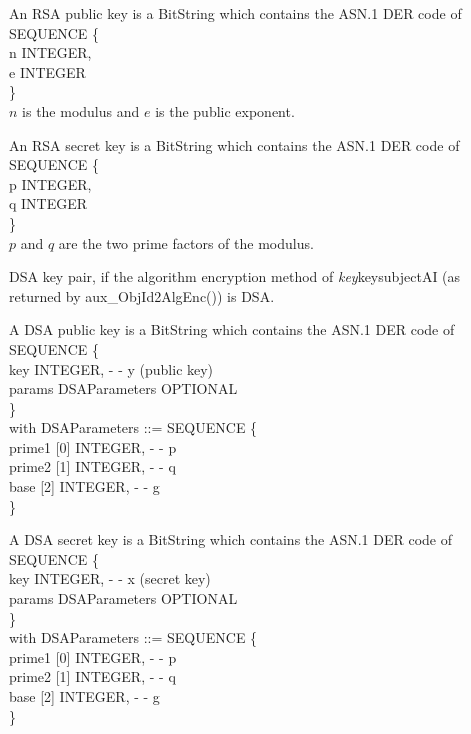     An RSA public key is a BitString
    which contains the ASN.1 DER code of
    \bvtab
    \4  SEQUENCE \{ \\
    \4  \2       n INTEGER,   \\
    \4  \2       e INTEGER  \\
    \4  \} \\
    \evtab
    $n$ is the modulus and $e$ is the public exponent.
    

    An RSA secret key is a BitString
    which contains the ASN.1 DER code of
    \bvtab
    \4  SEQUENCE \{ \\
    \4  \2       p INTEGER,   \\
    \4  \2       q INTEGER  \\
    \4  \} \\
    \evtab
    $p$ and $q$ are the two prime factors of the modulus.

\m  DSA key pair, 
    if the algorithm encryption method 
    of {\em key}\pf key\pf subjectAI (as returned by aux\_ObjId2AlgEnc()) is DSA. 

    A DSA public key is a BitString
    which contains the ASN.1 DER code of
    \bvtab
    \4  SEQUENCE \{ \\
    \4  \2       key INTEGER, - - y (public key)   \\
    \4  \2       params DSAParameters OPTIONAL  \\
    \4  \} \\
    \evtab
    with
    \bvtab
    DSAParameters ::= SEQUENCE \{ \\
    \4  \2       prime1 [0] INTEGER, - - p \\
    \4  \2       prime2 [1] INTEGER, - - q \\
    \4  \2       base [2] INTEGER, - - g \\
    \4  \} \\
    \evtab
    
    A DSA secret key is a BitString
    which contains the ASN.1 DER code of
    \bvtab
    \4  SEQUENCE \{ \\
    \4  \2       key INTEGER, - - x (secret key)   \\
    \4  \2       params DSAParameters OPTIONAL  \\
    \4  \} \\
    \evtab
    with
    \bvtab
    DSAParameters ::= SEQUENCE \{ \\
    \4  \2       prime1 [0] INTEGER, - - p \\
    \4  \2       prime2 [1] INTEGER, - - q \\
    \4  \2       base [2] INTEGER, - - g \\
    \4  \} \\
    \evtab
\ei

